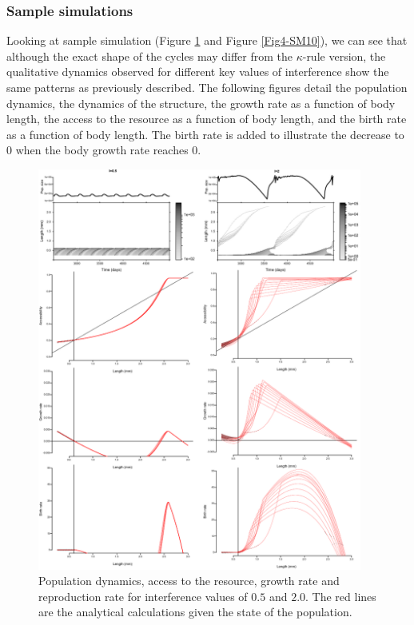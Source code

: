\subsubsection{Sample simulations}

Looking at sample simulation (Figure \ref{Fig4-SM9} and Figure \ref{Fig4-SM10}),
we can see that although the exact shape of the cycles may differ from the
$\kappa$-rule version, the qualitative dynamics observed for different key
values of interference show the same patterns as previously described. The following figures detail the
population dynamics, the dynamics of the structure, the growth rate as a
function of body length, the access to the resource as a function of body
length, and the birth rate as a function of body length. The birth rate is added
to illustrate the decrease to $0$ when the body growth rate reaches $0$.

\begin{figure}[!ht] %
\centering
\includegraphics[width=0.95\textwidth]{4_ChapThe1/Fig/FigSM9}
\caption[Sample simulation for I=0.5
and I=2.0 (net production model)]{Population dynamics, access to the resource,
growth rate and reproduction rate for interference values of $0.5$ and $2.0$. The red lines are the analytical calculations given the state of the population.}
\label{Fig4-SM9}
\end{figure}

